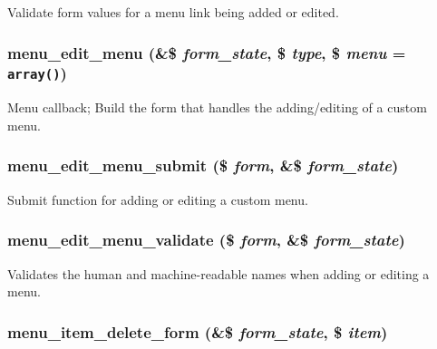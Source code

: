 Validate form values for a menu link being added or edited. \hypertarget{menu_8admin_8inc_19f0a855d2fdee878127cf13865fdf87}{
\subsubsection[{menu\_\-edit\_\-menu}]{\setlength{\rightskip}{0pt plus 5cm}menu\_\-edit\_\-menu (\&\$ {\em form\_\-state}, \/  \$ {\em type}, \/  \$ {\em menu} = {\tt array()})}}
\label{menu_8admin_8inc_19f0a855d2fdee878127cf13865fdf87}


Menu callback; Build the form that handles the adding/editing of a custom menu. \hypertarget{menu_8admin_8inc_71326ad2f1a2c791cc3e6081a9d28d26}{
\subsubsection[{menu\_\-edit\_\-menu\_\-submit}]{\setlength{\rightskip}{0pt plus 5cm}menu\_\-edit\_\-menu\_\-submit (\$ {\em form}, \/  \&\$ {\em form\_\-state})}}
\label{menu_8admin_8inc_71326ad2f1a2c791cc3e6081a9d28d26}


Submit function for adding or editing a custom menu. \hypertarget{menu_8admin_8inc_ec2a99bf39c5c18e9c1f1980a27baad7}{
\subsubsection[{menu\_\-edit\_\-menu\_\-validate}]{\setlength{\rightskip}{0pt plus 5cm}menu\_\-edit\_\-menu\_\-validate (\$ {\em form}, \/  \&\$ {\em form\_\-state})}}
\label{menu_8admin_8inc_ec2a99bf39c5c18e9c1f1980a27baad7}


Validates the human and machine-readable names when adding or editing a menu. \hypertarget{menu_8admin_8inc_d71465464dc932b36ed1cb8a0d59cf73}{
\subsubsection[{menu\_\-item\_\-delete\_\-form}]{\setlength{\rightskip}{0pt plus 5cm}menu\_\-item\_\-delete\_\-form (\&\$ {\em form\_\-state}, \/  \$ {\em item})}}
\label{menu_8admin_8inc_d71465464dc932b36ed1cb8a0d59cf73}


